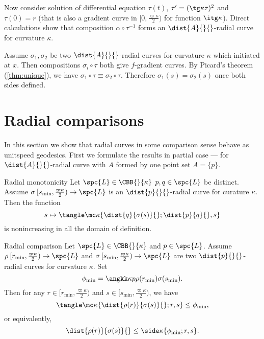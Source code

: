 Now consider solution of differential equation $\tau(t)$, $\tau'=(\tg\kappa\tau)^2$ and $\tau(0)=r$ 
(that is also a gradient curve in $[0,\tfrac{\varpi\kappa}2)$ for function $\itg\kappa$).
Direct calculations show that composition $\alpha\circ\tau^{-1}$ 
forms an $\dist{A}{}{}$-radial curve for curvature $\kappa$.

 Assume $\sigma_1,\sigma_2$ be two $\dist{A}{}{}$-radial curves for curvature $\kappa$ which initiated at $x$.
Then compositions $\sigma_i\circ\tau$ both give $f$-gradient curves.
By Picard's theorem (\ref{thm:unique}), we have
$\sigma_1\circ\tau 
\equiv 
\sigma_2\circ\tau$.
Therefore $\sigma_1(s)=\sigma_2(s)$ once both sides defined.
\qeds










\section{Radial comparisons}\label{sec:rad-curv}

In this section we show that radial curves in some comparison sense behave as unitspeed geodesics.
First we formulate the results in partial case --- for $\dist{A}{}{}$-radial curve with $A$ formed by one point set $A=\{p\}$.

\begin{thm}{Radial monotonicity}\label{rad-mon}
Let $\spc{L}\in\CBB{}{\kappa}$ 
$p, q\in \spc{L}$ be distinct.
Assume $\sigma\:  [s_{\min},\tfrac{\varpi\kappa}2)\to \spc{L}$
is an $\dist{p}{}{}$-radial curve for curature $\kappa$.
Then the function 
$$s\mapsto 
\tangle\mc\kappa\{
\dist{q}{\sigma(s)}{};
\dist{p}{q}{},
s
\}$$
is nonincreasing in all the domain of definition.
\end{thm}

\begin{thm}{Radial comparison}\label{rad-comp}
Let $\spc{L}\in\CBB{}{\kappa}$ 
and $p\in \spc{L}$.
Assume $\rho\:  [r_{\min},\tfrac{\varpi\kappa}2)\to \spc{L}$
and    $\sigma\:[s_{\min},\tfrac{\varpi\kappa}2)\to \spc{L}$
are two $\dist{p}{}{}$-radial curves for curvature $\kappa$.
Set
$$\phi_{\min}=\angkk\kappa p{\rho(r_{\min})}{\sigma(s_{\min})}.
$$
Then for any $r\in[r_{\min},\tfrac{\varpi\kappa}2)$ and  $s\in[s_{\min},\tfrac{\varpi\kappa}2)$,
we have
$$
\tangle\mc\kappa\{\dist{\rho(r)}{\sigma(s)}{};r,s\}
\le \phi_{\min},
$$
or equivalently,
$$
\dist{\rho(r)}{\sigma(s)}{}
\le \side\kappa\{\phi_{\min};r,s\}.
$$

\end{thm}


